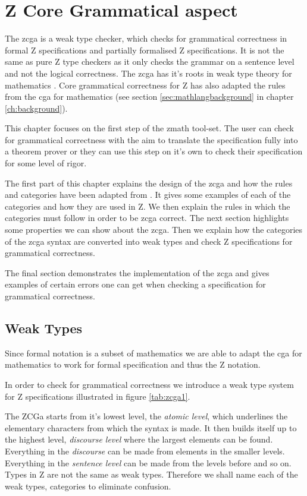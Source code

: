 \chapter{Z Core Grammatical aspect}
\label{ch:zcga}

The \gls{zcga} is a weak type checker, which checks for grammatical correctness
in formal Z specifications and partially formalised Z specifications. It is not
the same as pure Z type checkers as it only checks the grammar on a sentence
level and not the logical correctness. The \gls{zcga} has it's roots in weak
type theory for mathematics \cite{wtt}. Core grammatical correctness for Z has
also adapted the rules from the \gls{cga} for mathematics (see section
\ref{sec:mathlangbackground} in chapter \ref{ch:background}).

This chapter focuses on the first step of the \gls{zmath} tool-set. The user can
check for grammatical correctness with the aim to translate the specification
fully into a theorem prover or they can use this step on it's own to check their
specification for some level of rigor.

The first part of this chapter explains the design of the \gls{zcga} and how the
rules and categories have been adapted from \cite{wtt}. It gives some examples
of each of the categories and how they are used in Z. We then explain the rules
in which the categories must follow in order to be \gls{zcga} correct. The next
section highlights some properties we can show about the \gls{zcga}. Then we
explain how the categories of the \gls{zcga} syntax are converted into weak
types and check Z specifications for grammatical correctness.

The final section demonstrates the implementation of the \gls{zcga} and gives
examples of certain errors one can get when checking a specification for
grammatical correctness.

\section{Weak Types}

Since formal notation is a subset of mathematics we are able to adapt the
\gls{cga} for mathematics to work for formal specification and thus the Z
notation.

In order to check for grammatical correctness we introduce a weak type system
for Z specifications illustrated in figure \ref{tab:zcga1}.
 
The ZCGa starts from it's lowest level, the \emph{atomic level}, which
underlines the elementary characters from which the syntax is made. It then
builds itself up to the highest level, \emph{discourse level} where the largest
elements can be found. Everything in the \emph{discourse} can be made from
elements in the smaller levels. Everything in the \emph{sentence level} can be
made from the levels before and so on. Types in Z are not the same as weak
types. Therefore we shall name each of the weak types, categories to eliminate
confusion.

